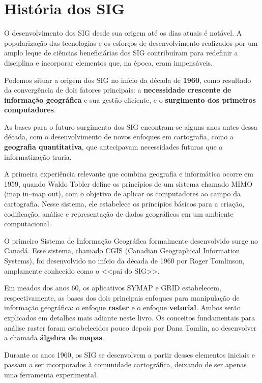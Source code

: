\chapter{História dos SIG}

\pagestyle{fancy}

O desenvolvimento dos SIG desde sua origem até os dias atuais é notável. A popularização das tecnologias e os esforços de desenvolvimento realizados por um amplo leque de ciências beneficiárias dos SIG contribuíram para redefinir a disciplina e incorporar elementos que, na época, eram impensáveis.

Podemos situar a origem dos SIG no início da década de \textbf{1960}, como resultado da convergência de dois fatores principais: a \textbf{necessidade crescente de informação geográfica} e sua gestão eficiente, e o \textbf{surgimento dos primeiros computadores}.

As bases para o futuro surgimento dos SIG encontram-se alguns anos antes dessa década, com o desenvolvimento de novos enfoques em cartografia, como a \textbf{geografia quantitativa}, que antecipavam necessidades futuras que a informatização traria.

A primeira experiência relevante que combina geografia e informática ocorre em 1959, quando Waldo Tobler define os princípios de um sistema chamado MIMO (map in--map out), com o objetivo de aplicar os computadores ao campo da cartografia. Nesse sistema, ele estabelece os princípios básicos para a criação, codificação, análise e representação de dados geográficos em um ambiente computacional.

O primeiro Sistema de Informação Geográfica formalmente desenvolvido surge no Canadá. Esse sistema, chamado CGIS (Canadian Geographical Information Systems), foi desenvolvido no início da década de 1960 por Roger Tomlinson, amplamente conhecido como o <<pai do SIG>>.

Em meados dos anos 60, os aplicativos SYMAP e GRID estabelecem, respectivamente, as bases dos dois principais enfoques para manipulação de informação geográfica: o enfoque \textbf{raster} e o enfoque \textbf{vetorial}. Ambos serão explicados em detalhes mais adiante neste livro. Os conceitos fundamentais para análise raster foram estabelecidos pouco depois por Dana Tomlin, ao desenvolver a chamada \textbf{álgebra de mapas}.

Durante os anos 1960, os SIG se desenvolvem a partir desses elementos iniciais e passam a ser incorporados à comunidade cartográfica, deixando de ser apenas uma ferramenta experimental.

